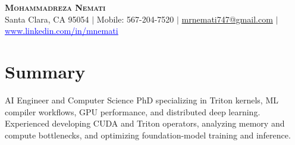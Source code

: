 \documentclass[letterpaper,13pt]{article}
\begin{document}
\begin{center}
    \textbf{\LARGE \scshape Mohammadreza Nemati} \\ \vspace{1pt}
    \small Santa Clara, CA 95054 $|$ Mobile: 567-204-7520 $|$
    \href{mailto:mrnemati747@gmail.com}{mrnemati747@gmail.com} $|$
    \href{https://www.linkedin.com/in/mnemati/}{\textcolor{blue}{\underline{www.linkedin.com/in/mnemati}}}
\end{center}

\section{Summary}
\small{AI Engineer and Computer Science PhD specializing in Triton kernels, ML compiler workflows, GPU performance, and distributed deep learning. Experienced developing CUDA and Triton operators, analyzing memory and compute bottlenecks, and optimizing foundation-model training and inference.}
\vspace{0.05cm}
\end{document}
